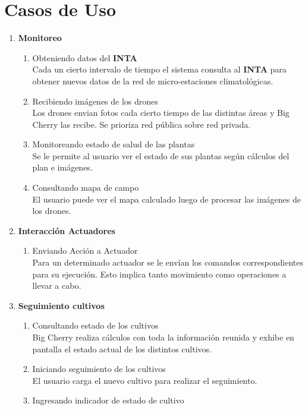 \section{Casos de Uso}

\begin{enumerate}
 \item \textbf{Monitoreo}
 \begin{enumerate}
    \item Obteniendo datos del \textbf{INTA}\\
    Cada un cierto intervalo de tiempo el sistema consulta al \textbf{INTA} para obtener nuevos datos de la red de micro-estaciones climatol\'ogicas.
    \item Recibiendo imágenes de los drones\\
	Los drones envian fotos cada cierto tiempo de las distintas áreas y Big Cherry las recibe. Se prioriza red pública sobre red privada.
    \item Monitoreando estado de salud de las plantas\\
	Se le permite al usuario ver el estado de sus plantas según cálculos del plan e im\'agenes.
    \item Consultando mapa de campo\\
	El usuario puede ver el mapa calculado luego de procesar las imágenes de los drones.
 \end{enumerate}
 \item \textbf{Interacci\'on Actuadores}
 \begin{enumerate}
  \item Enviando Acción a Actuador\\
   Para un determinado actuador se le envían los comandos correspondientes para su ejecución. Esto implica tanto movimiento como operaciones a llevar a cabo.
 \end{enumerate}
 \item \textbf{Seguimiento cultivos}
 \begin{enumerate}
  \item Consultando estado de los cultivos\\
  Big Cherry realiza cálculos con toda la informaci\'on reunida y exhibe en pantalla el estado actual de los distintos cultivos.
  \item Iniciando seguimiento de los cultivos\\
	El usuario carga el nuevo cultivo para realizar el seguimiento.
  \item Ingresando indicador de estado de cultivo\\

\end{enumerate}
\end{enumerate}
